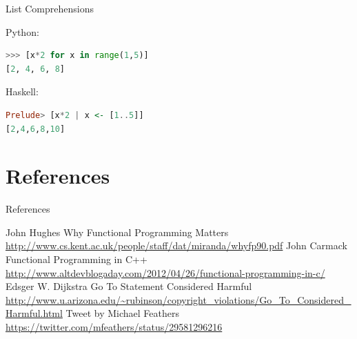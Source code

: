 \documentclass{beamer}
\begin{document}
\begin{frame}[fragile]{List Comprehensions}

Python:
  \begin{lstlisting}[language=Python]
>>> [x*2 for x in range(1,5)]
[2, 4, 6, 8]
  \end{lstlisting}

Haskell:
  \begin{lstlisting}[language=Haskell]
Prelude> [x*2 | x <- [1..5]]
[2,4,6,8,10]
  \end{lstlisting}

\end{frame}

\section{References}

\begin{frame}[allowframebreaks]{References}
  \begin{thebibliography}{10}
      John Hughes
      \newblock Why Functional Programming Matters
      \newblock \url{http://www.cs.kent.ac.uk/people/staff/dat/miranda/whyfp90.pdf}
      John Carmack
      \newblock Functional Programming in C++
      \newblock \url{http://www.altdevblogaday.com/2012/04/26/functional-programming-in-c/}
      Edsger W. Dijkstra
      \newblock Go To Statement Considered Harmful
      \newblock \url{http://www.u.arizona.edu/~rubinson/copyright_violations/Go_To_Considered_Harmful.html}
      Tweet by Michael Feathers
      \newblock \url{https://twitter.com/mfeathers/status/29581296216}
  \end{thebibliography}
\end{frame}
\end{document}
